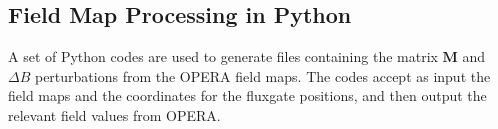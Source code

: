 % 



\subsection{Field Map Processing in Python}

A set of Python codes are used to generate files containing the matrix
$\bm{M}$ and $\Delta B$ perturbations from the OPERA field maps.
The codes accept as input the field maps and the coordinates for the
fluxgate positions, and then output the relevant field values from
OPERA.






